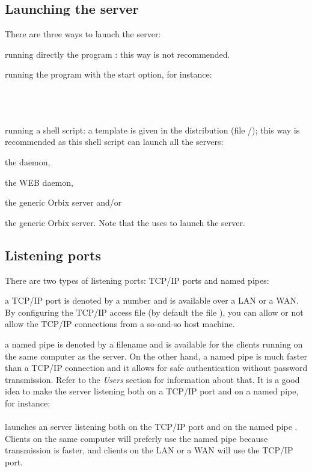 \subsection{Launching the server}
There are three ways to launch the server:
\be
\item running directly the program : this way is not
recommended.
\item running the program  with the {start} option, for
instance: \\
\mbox{ } \\
\mbox{ } \\
\mbox{ }
\item running a  shell script: a template is given
in the distribution (file \tdir/); this way
is recommended as this shell script can launch all the \eyedb servers:
\be
\item the  daemon,
\item the  WEB daemon,
\item the  generic Orbix server and/or
\item the  generic Orbix server.
\ee
\ee
Note that the  uses  to launch the
\eyedb server.
\subsection{Listening ports}
There are two types of listening ports: TCP/IP ports and named pipes:
\bi
\item a TCP/IP port is denoted by a number and is available over
a LAN
or a WAN. By configuring the TCP/IP access file (by default the file
), you can allow or not allow the TCP/IP connections
from a so-and-so host machine.
\item a named pipe is denoted by a filename and is available for
the clients running on the same computer as the server. On the other
hand, a named pipe is much faster than a TCP/IP connection and it allows
for safe authentication without password transmission. Refer
to the \emph{Users} section for information about that.
\ei
It is a good idea to make the \eyedb server listening both on
a TCP/IP port and on a named pipe, for instance:\\
\\
launches an \eyedb server listening both on the TCP/IP port 
and on the named pipe .
\\
Clients on the same computer will preferly use the named pipe because
transmission is faster, and clients on the LAN or a WAN will use
the TCP/IP port.
